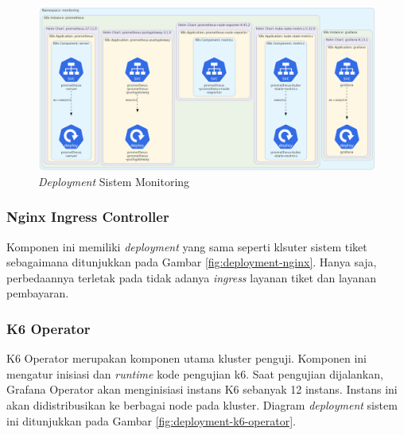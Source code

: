 \begin{figure}[H]
    \centering
    \includegraphics[width=1\textwidth]{resources/chapter-4/agent-monitoring.png}
    \caption{\textit{Deployment} Sistem Monitoring}
    \label{fig:deployment-monitoring-agent}
\end{figure}

\subsubsection{Nginx Ingress Controller}

Komponen ini memiliki \textit{deployment} yang sama seperti klsuter sistem tiket sebagaimana ditunjukkan pada Gambar \ref{fig:deployment-nginx}. Hanya saja, perbedaannya terletak pada tidak adanya \textit{ingress} layanan tiket dan layanan pembayaran.

\pagebreak

\subsubsection{K6 Operator}

K6 Operator merupakan komponen utama kluster penguji. Komponen ini mengatur inisiasi dan \textit{runtime} kode pengujian k6. Saat pengujian dijalankan, Grafana Operator akan menginisiasi instans K6 sebanyak 12 instans. Instans ini akan didistribusikan ke berbagai node pada kluster. Diagram \textit{deployment} sistem ini ditunjukkan pada Gambar \ref{fig:deployment-k6-operator}.

